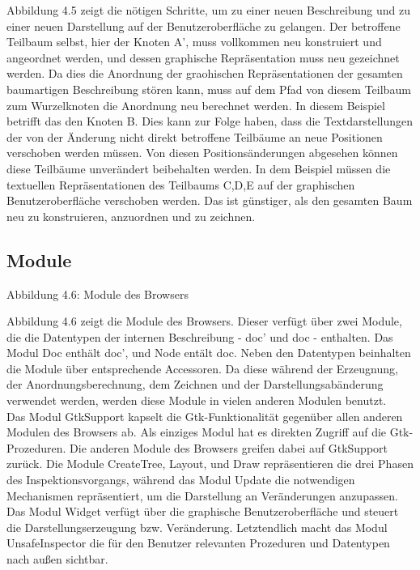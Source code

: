 \documentclass[12pt,a4paper]{article}
\begin{document}
Abbildung 4.5 zeigt die n\"otigen Schritte, um 
zu einer 
neuen Beschreibung und zu einer neuen Darstellung 
auf der Benutzeroberfl\"ache zu gelangen. 
Der betroffene Teilbaum selbst, hier der Knoten A', 
 muss vollkommen neu konstruiert 
und angeordnet werden, und dessen graphische Repr\"asentation 
muss neu gezeichnet werden. Da dies die Anordnung der 
graohischen Repr\"asentationen der gesamten 
baumartigen Beschreibung st\"oren kann, muss auf dem Pfad von 
diesem Teilbaum zum Wurzelknoten die Anordnung neu berechnet werden. 
In diesem Beispiel betrifft das den Knoten B.
Dies kann zur Folge haben, dass die Textdarstellungen 
der von der \"Anderung nicht direkt 
betroffene Teilb\"aume an neue Positionen verschoben 
werden m\"ussen. Von diesen Positions\"{a}nderungen 
abgesehen k\"onnen diese Teilb\"aume unver\"andert 
beibehalten werden.
In dem Beispiel m\"ussen die textuellen Repr\"asentationen
des Teilbaums {C,D,E} auf der graphischen Benutzeroberfl\"ache 
verschoben werden.
Das ist g\"unstiger, als den gesamten 
Baum neu zu konstruieren, anzuordnen und zu zeichnen.   
 

\subsection{Module}

\begin{center}
\linebreak Abbildung 4.6: Module des Browsers
\end{center}

Abbildung 4.6 zeigt die Module des Browsers.
Dieser verf\"{u}gt \"{u}ber zwei Module, die 
die Datentypen der internen Beschreibung  - doc' und doc - enthalten.
Das Modul Doc enth\"alt doc', und Node ent\"alt doc.
Neben den Datentypen beinhalten die Module \"{u}ber 
entsprechende Accessoren.
Da diese w\"{a}hrend der 
Erzeugnung, der Anordnungsberechnung, dem Zeichnen 
und der Darstellungsab\"{a}nderung verwendet werden, 
werden diese Module in vielen anderen Modulen benutzt.\\
Das Modul GtkSupport kapselt die Gtk-Funktionalit\"{a}t 
gegen\"{u}ber allen anderen Modulen des Browsers ab. 
Als einziges Modul hat es direkten Zugriff auf die 
Gtk-Prozeduren. Die anderen Module des Browsers 
greifen dabei auf GtkSupport zur\"{u}ck.
Die Module CreateTree, Layout, und Draw repr\"{a}sentieren 
die drei Phasen des Inspektionsvorgangs, w\"ahrend das Modul 
Update die notwendigen Mechanismen repr\"asentiert, 
um die Darstellung an Ver\"{a}nderungen anzupassen. 
Das Modul Widget verf\"{u}gt \"{u}ber die 
graphische Benutzeroberfl\"{a}che und steuert 
die Darstellungserzeugung bzw. Ver\"{a}nderung. 
Letztendlich macht das Modul UnsafeInspector die f\"{u}r den 
Benutzer relevanten Prozeduren und Datentypen nach au\ss en sichtbar.
\end{document}
